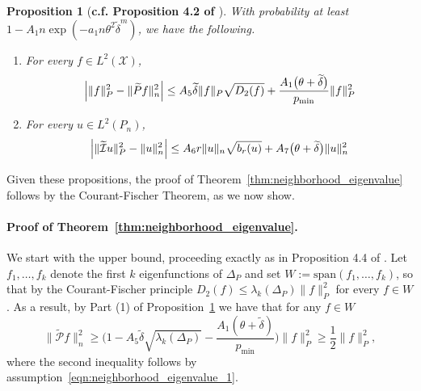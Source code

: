 \documentclass[twoside]{article}
\newcommand{\1}{\mathbf{1}}
\newcommand{\Xset}{\mathcal{X}}
\newcommand{\Leb}{L}
\newcommand{\mc}[1]{\mathcal{#1}}
\newcommand{\wt}[1]{\widetilde{#1}}
\newtheorem{proposition}{Proposition}
\theoremstyle{definition}
\theoremstyle{remark}
\begin{document}
\begin{proposition}[\textbf{c.f. Proposition 4.2 of \citet{calder2019}}]
	\label{prop:isometry}
	With probability at least $1 - A_1n\exp(-a_1n\theta^2\wt{\delta}^{m})$, we have the following.
	\begin{enumerate}[(1)]
		\item For every $f \in \Leb^2(\Xset)$,
		\begin{equation*}
		\Bigl|\|f\|_{P}^2 - \|\wt{P}f\|_{n}^2\Bigr| \leq A_5 \wt{\delta} \|f\|_{P} \sqrt{D_2(f)} + \frac{A_1\bigl(\theta + \wt{\delta}\bigr)}{p_{\min}} \|f\|_{P}^2
		\end{equation*}
		\item For every $u \in \Leb^2(P_n)$,
		\begin{equation*}
		\Bigl|\|\wt{\mc{I}}u\|_{P}^2 - \|u\|_{n}^2\Bigr| \leq A_6 r \|u\|_{n} \sqrt{b_r(u)} + A_7\bigl(\theta + \wt{\delta}\bigr) \|u\|_{n}^2
		\end{equation*}
	\end{enumerate}
\end{proposition}

Given these propositions, the proof of Theorem~\ref{thm:neighborhood_eigenvalue} follows by the Courant-Fischer Theorem, as we now show.

\paragraph{Proof of Theorem~\ref{thm:neighborhood_eigenvalue}.}
We start with the upper bound, proceeding exactly as in Proposition 4.4 of \citep{burago2014}. Let $f_1,\ldots,f_{k}$ denote the first $k$ eigenfunctions of $\Delta_P$ and set $W := \mathrm{span}(f_1,\ldots,f_k)$, so that by the Courant-Fischer principle $D_2(f) \leq \lambda_k(\Delta_P) \|f\|_{P}^2$ for every $f \in W$. As a result, by Part (1) of Proposition~\ref{prop:isometry} we have that for any $f \in W$
\begin{equation*}
\bigl\|\wt{\mc{P}}f\bigr\|_{n}^2 \geq \biggl(1 - A_5\wt{\delta} \sqrt{\lambda_{k}(\Delta_P)} - \frac{A_1(\theta + \wt{\delta})}{p_{\min}}\biggr)\|f\|_{P}^2  \geq \frac{1}{2} \|f\|_{P}^2,
\end{equation*}
where the second inequality follows by assumption~\eqref{eqn:neighborhood_eigenvalue_1}.
\end{document}

